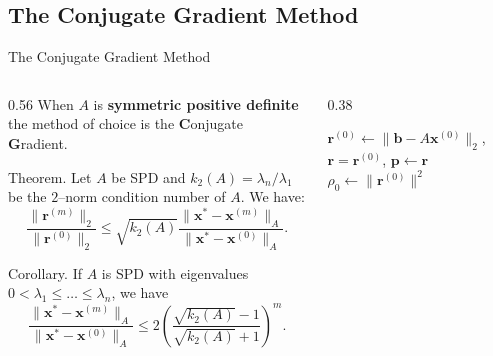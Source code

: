 \documentclass[aspectratio=169,xcolor=dvipsnames]{beamer}
\newcommand{\R}{\mathbb{R}}
\begin{document}
\subsection{The Conjugate Gradient Method}

\begin{frame}{The Conjugate Gradient Method}

\begin{columns}
\begin{column}{0.56\columnwidth}
When $A$ is \alert{\textbf{symmetric positive definite}} the method of choice is the \textbf{C}onjugate \textbf{G}radient.

\begin{alertblock}{Theorem.}
Let $A$ be SPD and $k_2(A)=\lambda_n/\lambda_1$ be the $2$--norm
condition number of $A$. We have:\vspace{-0.5em}
\begin{equation*}
	\frac{\|\mathbf{r}^{(m)}\|_2}{\|\mathbf{r}^{(0)}\|_2}\leq
	\sqrt{k_2(A)}
	\frac{\|\mathbf{x}^{*}-\mathbf{x}^{(m)}\|_A}{\|\mathbf{x}^{*}-\mathbf{x}^{(0)}\|_A}.
\end{equation*}
\end{alertblock}

\begin{alertblock}{Corollary.}
If $A$ is SPD with eigenvalues $0<\lambda_1\leq\ldots\leq\lambda_n$, we have\vspace{-0.5em}
\begin{equation*}
	\frac{\|\mathbf{x}^*-\mathbf{x}^{(m)}\|_A}{\|\mathbf{x}^*-\mathbf{x}^{(0)}\|_A}
	\leq 2\left ( \frac{\sqrt{k_2(A)}-1}{\sqrt{k_2(A)}+1}\right)^m.
\end{equation*}
\end{alertblock}

\end{column}
\begin{column}{0.38\columnwidth}
\begin{algorithm}[H]\scriptsize
	\KwIn{$A \in \R^{n\times n}$ SPD, $N_{max}$, $\mathbf{x}^{(0)}$}
	$\mathbf{r}^{(0)}\leftarrow \|\mathbf{b}-A \mathbf{x}^{(0)}\|_2 $, $\mathbf{r}=\mathbf{r}^{(0)}$, $\mathbf{p}\leftarrow \mathbf{r}$\;
	$\rho_0\leftarrow\|\mathbf{r}^{(0)}\|^2$\;
\end{algorithm}
\end{column}
\end{columns}

\end{frame}
\end{document}
